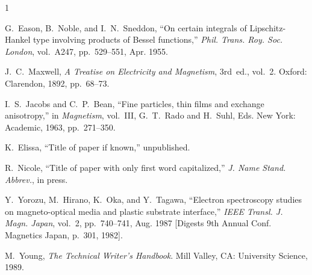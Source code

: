 \documentclass[conference, letterpaper]{IEEEtran}
\begin{document}
\balance

\begin{thebibliography}{1}

G.~Eason, B.~Noble, and I.~N.~Sneddon, ``On certain integrals of Lipschitz-Hankel type involving products of Bessel functions,'' \emph{Phil. Trans. Roy. Soc. London}, vol.~A247, pp.~529--551, Apr. 1955.

J.~C.~Maxwell, \emph{A Treatise on Electricity and Magnetism}, 3rd~ed., vol.~2. Oxford: Clarendon, 1892, pp.~68--73.

I.~S.~Jacobs and C.~P.~Bean, ``Fine particles, thin films and exchange anisotropy,'' in \emph{Magnetism}, vol.~III, G.~T.~Rado and H.~Suhl, Eds. New York: Academic, 1963, pp.~271--350.

K.~Elissa, ``Title of paper if known,'' unpublished.

R.~Nicole, ``Title of paper with only first word capitalized,'' \emph{J. Name Stand. Abbrev.}, in press.

Y.~Yorozu, M.~Hirano, K.~Oka, and Y.~Tagawa, ``Electron spectroscopy studies on magneto-optical media and plastic substrate interface,'' \emph{IEEE Transl. J. Magn. Japan}, vol.~2, pp.~740--741, Aug. 1987 [Digests 9th Annual Conf. Magnetics Japan, p.~301, 1982].

M.~Young, \emph{The Technical Writer’s Handbook}. Mill Valley, CA: University Science, 1989.

\end{thebibliography}




\end{document}
